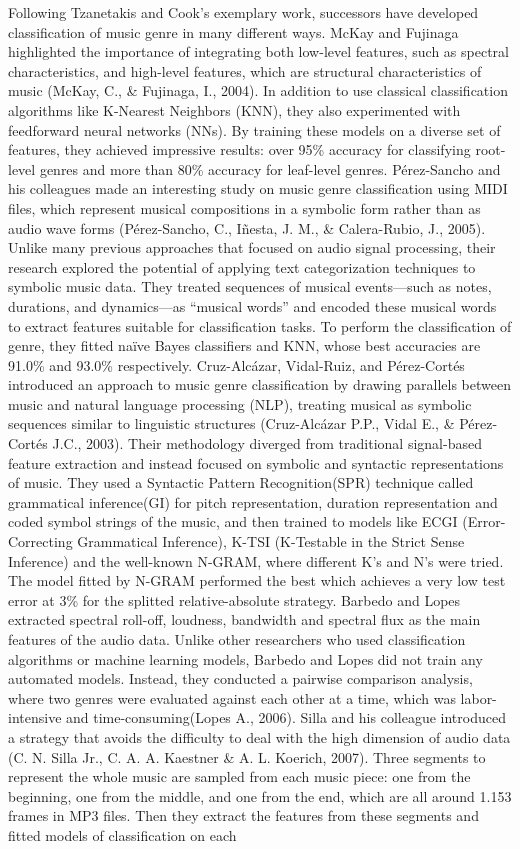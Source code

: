 Following Tzanetakis and Cook's exemplary work, successors have developed classification of music genre in many different ways. McKay and Fujinaga highlighted the importance of integrating both low-level features, such as spectral characteristics, and high-level features, which are structural characteristics of music (McKay, C., \& Fujinaga, I., 2004). In addition to use classical classification algorithms like K-Nearest Neighbors (KNN), they also experimented with feedforward neural networks (NNs). By training these models on a diverse set of features, they achieved impressive results: over 95\% accuracy for classifying root-level genres and more than 80\% accuracy for leaf-level genres. Pérez-Sancho and his colleagues made an interesting study on music genre classification using MIDI files, which represent musical compositions in a symbolic form rather than as audio wave forms (Pérez-Sancho, C., Iñesta, J. M., \& Calera-Rubio, J., 2005). Unlike many previous approaches that focused on audio signal processing, their research explored the potential of applying text categorization techniques to symbolic music data. They treated sequences of musical events—such as notes, durations, and dynamics—as “musical words” and encoded these musical words to extract features suitable for classification tasks. To perform the classification of genre, they fitted naïve Bayes classifiers and KNN, whose best accuracies are 91.0\% and 93.0\% respectively. Cruz-Alcázar, Vidal-Ruiz, and Pérez-Cortés introduced an approach to music genre classification by drawing parallels between music and natural language processing (NLP), treating musical as symbolic sequences similar to linguistic structures (Cruz-Alcázar P.P., Vidal E., \& Pérez-Cortés J.C., 2003). Their methodology diverged from traditional signal-based feature extraction and instead focused on symbolic and syntactic representations of music. They used a Syntactic Pattern Recognition(SPR) technique called grammatical inference(GI) for pitch representation, duration representation and coded symbol strings of the music, and then trained to models like ECGI (Error-Correcting Grammatical Inference), K-TSI (K-Testable in the Strict Sense Inference) and the well-known N-GRAM, where different K's and N's were tried. The model fitted by N-GRAM performed the best which achieves a very low test error at 3\% for the splitted relative-absolute strategy. Barbedo and Lopes extracted spectral roll-off, loudness, bandwidth and spectral flux as the main features of the audio data. Unlike other researchers who used classification algorithms or machine learning models, Barbedo and Lopes did not train any automated models. Instead, they conducted a pairwise comparison analysis, where two genres were evaluated against each other at a time, which was labor-intensive and time-consuming(Lopes A., 2006). Silla and his colleague introduced a strategy that avoids the difficulty to deal with the high dimension of audio data (C. N. Silla Jr., C. A. A. Kaestner \& A. L. Koerich, 2007). Three segments to represent the whole music are sampled from each music piece: one from the beginning, one from the middle, and one from the end, which are all around 1.153 frames in MP3 files. Then they extract the features from these segments and fitted models of classification on each 